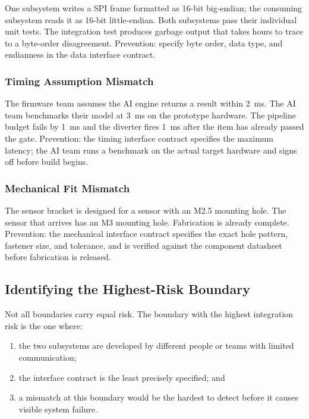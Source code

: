 One subsystem writes a SPI frame formatted as 16-bit big-endian; the consuming subsystem reads it as 16-bit little-endian.
Both subsystems pass their individual unit tests.
The integration test produces garbage output that takes hours to trace to a byte-order disagreement.
Prevention: specify byte order, data type, and endianness in the data interface contract.

\subsubsection{Timing Assumption Mismatch}
\label{subsubsec:ch5-timing-mismatch}

The firmware team assumes the AI engine returns a result within 2~ms.
The AI team benchmarks their model at 3~ms on the prototype hardware.
The pipeline budget fails by 1~ms and the diverter fires 1~ms after the item has already passed the gate.
Prevention: the timing interface contract specifies the maximum latency; the AI team runs a benchmark on the actual target hardware and signs off before build begins.

\subsubsection{Mechanical Fit Mismatch}
\label{subsubsec:ch5-mechanical-mismatch}

The sensor bracket is designed for a sensor with an M2.5 mounting hole.
The sensor that arrives has an M3 mounting hole.
Fabrication is already complete.
Prevention: the mechanical interface contract specifies the exact hole pattern, fastener size, and tolerance, and is verified against the component datasheet before fabrication is released.

\subsection{Identifying the Highest-Risk Boundary}
\label{subsec:ch5-highest-risk}

Not all boundaries carry equal risk.
The boundary with the highest integration risk is the one where:
\begin{enumerate}
  \item the two subsystems are developed by different people or teams with limited communication;
  \item the interface contract is the least precisely specified; and
  \item a mismatch at this boundary would be the hardest to detect before it causes visible system failure.
\end{enumerate}

